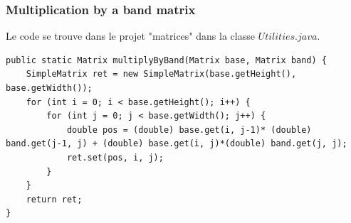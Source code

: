 \subsubsection{Multiplication by a band matrix}
Le code se trouve dans le projet "matrices" dans la classe $Utilities.java$.
\begin{lstlisting}
public static Matrix multiplyByBand(Matrix base, Matrix band) {
    SimpleMatrix ret = new SimpleMatrix(base.getHeight(), base.getWidth());
    for (int i = 0; i < base.getHeight(); i++) {
        for (int j = 0; j < base.getWidth(); j++) {
            double pos = (double) base.get(i, j-1)* (double) band.get(j-1, j) + (double) base.get(i, j)*(double) band.get(j, j);
            ret.set(pos, i, j);
        }
    }
    return ret;
}
\end{lstlisting}